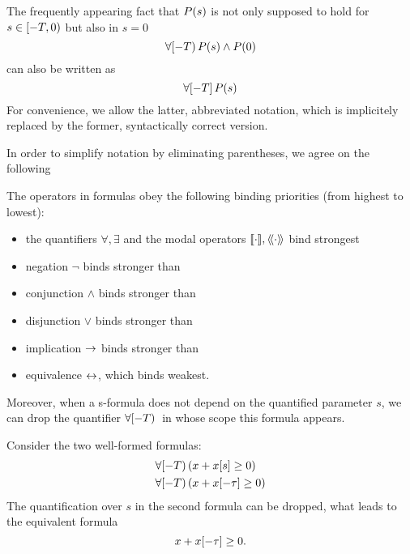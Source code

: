     \begin{convention}
        The frequently appearing fact that $P(s)$ is not only supposed to hold for $s\in[-T,0)$ but also in $s=0$
        \begin{equation*}
            \forall [-T){\,} P(s)\land P(0)
        \end{equation*}
        can also be written as
        \begin{equation*}
            \forall [-T]{\,} P(s)
        \end{equation*}
        For convenience, we allow the latter, abbreviated notation, which is implicitely replaced by the former, syntactically correct version.
    \end{convention}

    In order to simplify notation by eliminating parentheses, we agree on the following
    \begin{convention}
        The operators in \ddL formulas obey the following binding priorities (from highest to lowest):
        \begin{itemize}
            \item the quantifiers $\forall,\exists$ and the modal operators $\dbox{\cdot}{},\ddiamond{\cdot}{}$ bind strongest
            \item negation $\lnot$ binds stronger than
            \item conjunction $\land$ binds stronger than 
            \item disjunction $\lor$ binds stronger than
            \item implication $\rightarrow$ binds stronger than
            \item equivalence $\leftrightarrow$, which binds weakest.
        \end{itemize}
    \end{convention}

    Moreover, when a s-formula does not depend on the quantified parameter $s$, we can drop the quantifier $\forall [-T){\,}$ in whose scope this formula appears.

    \begin{example}
        Consider the two well-formed \ddL formulas:
        \begin{align*}
            &\forall [-T){\,} (x+x[s]\geq 0)\\
            &\forall [-T){\,} (x+x[-\tau]\geq 0) 
        \end{align*}
        The quantification over $s$ in the second formula can be dropped, what leads to the equivalent formula
        \begin{equation*}
            x+x[-\tau]\geq 0.
        \end{equation*}
    \end{example}


